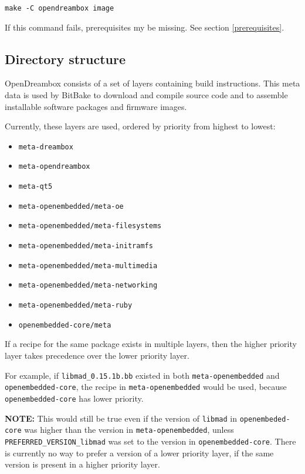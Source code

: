 \documentclass[a4paper]{article}
\newcommand{\shell}[1]{\texttt{\small #1}}
\begin{document}
    \shell{make -C opendreambox image}

    If this command fails, prerequisites my be missing. See section \ref{prerequisites}.

  \subsection{Directory structure}
    OpenDreambox consists of a set of layers containing build instructions.
    This meta data is used by BitBake to download and compile source code
    and to assemble installable software packages and firmware images.

    Currently, these layers are used, ordered by priority from highest to
    lowest:

    \begin{itemize}
      \item \shell{meta-dreambox}
      \item \shell{meta-opendreambox}
      \item \shell{meta-qt5}
      \item \shell{meta-openembedded/meta-oe}
      \item \shell{meta-openembedded/meta-filesystems}
      \item \shell{meta-openembedded/meta-initramfs}
      \item \shell{meta-openembedded/meta-multimedia}
      \item \shell{meta-openembedded/meta-networking}
      \item \shell{meta-openembedded/meta-ruby}
      \item \shell{openembedded-core/meta}
    \end{itemize}

    If a recipe for the same package exists in multiple layers,
    then the higher priority layer takes precedence over the lower priority
    layer.

    For example, if \shell{libmad\_0.15.1b.bb} existed in both
    \shell{meta-openembedded} and \shell{openembedded-core}, the recipe in
    \shell{meta-openembedded} would be used, because \shell{openembedded-core}
    has lower priority.

    \textbf{NOTE:} This would still be true even if the version of \shell{libmad} in
    \shell{openembeded-core} was higher than the version in \shell{meta-openembedded},
    unless \shell{PREFERRED\_VERSION\_libmad} was set to the version in \shell{openembedded-core}.
    There is currently no way to prefer a version of a lower priority layer, if the
    same version is present in a higher priority layer.
\end{document}
